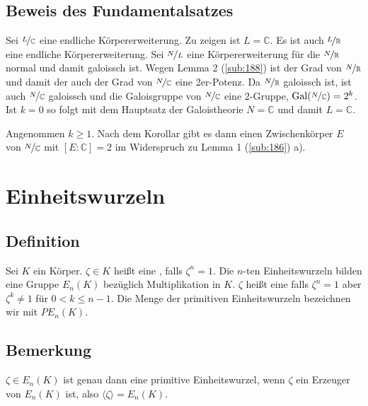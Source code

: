 \subsection{Beweis des Fundamentalsatzes} %
\label{sub:1811}
Sei $\nicefrac{L}{\mathds{C}}$ eine endliche Körpererweiterung. Zu zeigen ist $L=\mathds{C}$. Es ist auch $\nicefrac{L}{\mathds{R}}$ eine endliche Körpererweiterung. Sei
$\nicefrac{N}{L}$ eine Körpererweiterung für die $\nicefrac{N}{\mathds{R}}$ normal und damit galoissch ist. Wegen Lemma 2 (\ref{sub:188}) ist der Grad von 
$\nicefrac{N}{\mathds{R}}$ und damit der auch der Grad von $\nicefrac{N}{\mathds{C}}$ eine 2er-Potenz. Da $\nicefrac{N}{\mathds{R}}$ galoissch ist, ist auch 
$\nicefrac{N}{\mathds{C}}$ galoissch und die Galoisgruppe von $\nicefrac{N}{\mathds{C}}$ eine $2$-Gruppe, $\Gal(\nicefrac{N}{\mathds{C}})= 2^k$. Ist $k=0$ so folgt mit dem
Hauptsatz der Galoistheorie $N=\mathds{C}$ und damit $L=\mathds{C}$.

Angenommen $k \ge 1$. Nach dem Korollar gibt es dann einen Zwischenkörper $E$ von $\nicefrac{N}{\mathds{C}}$ mit $[E:\mathds{C}] =2$ im Widerspruch zu 
Lemma 1 (\ref{sub:186}) a). \bewende
\newpage

\section{Einheitswurzeln} %
\label{sec:19}

\subsection[Definition: Einheitswurzel]{Definition} %
\label{sub:191}
Sei $K$ ein Körper. $\zeta \in K$ heißt eine , falls $\zeta^n =1$. 
Die $n$-ten Einheitswurzeln bilden
eine Gruppe $E_n(K)$ bezüglich Multiplikation in $K$. $\zeta$ heißt eine 
 falls
$\zeta^n =1$ aber $\zeta^k\not= 1$ für $0 < k \le n-1$. Die Menge der primitiven Einheitswurzeln bezeichnen wir mit $PE_n(K)$.

\subsection[Bemerkung: Primitive Einheitswurzeln erzeugen die Gruppe der Einheitswurzeln]{Bemerkung} %
\label{sub:192}
$\zeta \in E_n(K)$ ist genau dann eine primitive Einheitswurzel, wenn $\zeta$ ein Erzeuger von $E_n(K)$ ist, also $\langle \zeta \rangle = E_n(K)$.

